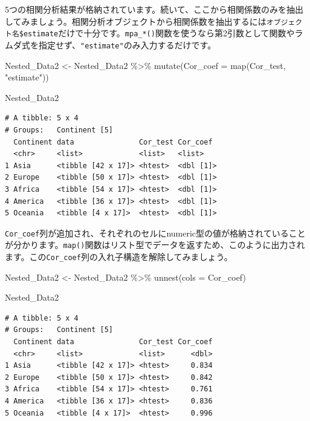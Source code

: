 \documentclass[
  a4paper,
  pandoc,
  ja=standard,
  jafont=haranoaji]{bxjsbook}
\newenvironment{Shaded}{\begin{snugshade}}{\end{snugshade}}
\newcommand{\AttributeTok}[1]{\textcolor[rgb]{0.00,0.48,0.65}{#1}}
\newcommand{\FunctionTok}[1]{\textcolor[rgb]{0.28,0.35,0.67}{#1}}
\newcommand{\NormalTok}[1]{\textcolor[rgb]{0.00,0.48,0.65}{#1}}
\newcommand{\OtherTok}[1]{\textcolor[rgb]{0.00,0.48,0.65}{#1}}
\newcommand{\SpecialCharTok}[1]{\textcolor[rgb]{0.37,0.37,0.37}{#1}}
\newcommand{\StringTok}[1]{\textcolor[rgb]{0.13,0.47,0.30}{#1}}
\begin{document}
5つの相関分析結果が格納されています。続いて、ここから相関係数のみを抽出してみましょう。相関分析オブジェクトから相関係数を抽出するには\texttt{オブジェクト名\$estimate}だけで十分です。\texttt{mpa\_*()}関数を使うなら第2引数として関数やラムダ式を指定せず、\texttt{"estimate"}のみ入力するだけです。

\begin{Shaded}
\begin{Highlighting}[numbers=left,,]
\NormalTok{Nested\_Data2 }\OtherTok{\textless{}{-}}\NormalTok{ Nested\_Data2 }\SpecialCharTok{\%\textgreater{}\%}
  \FunctionTok{mutate}\NormalTok{(}\AttributeTok{Cor\_coef =} \FunctionTok{map}\NormalTok{(Cor\_test, }\StringTok{"estimate"}\NormalTok{))}

\NormalTok{Nested\_Data2}
\end{Highlighting}
\end{Shaded}

\begin{verbatim}
# A tibble: 5 x 4
# Groups:   Continent [5]
  Continent data               Cor_test Cor_coef 
  <chr>     <list>             <list>   <list>   
1 Asia      <tibble [42 x 17]> <htest>  <dbl [1]>
2 Europe    <tibble [50 x 17]> <htest>  <dbl [1]>
3 Africa    <tibble [54 x 17]> <htest>  <dbl [1]>
4 America   <tibble [36 x 17]> <htest>  <dbl [1]>
5 Oceania   <tibble [4 x 17]>  <htest>  <dbl [1]>
\end{verbatim}

\texttt{Cor\_coef}列が追加され、それぞれのセルにnumeric型の値が格納されていることが分かります。\texttt{map()}関数はリスト型でデータを返すため、このように出力されます。この\texttt{Cor\_coef}列の入れ子構造を解除してみましょう。

\begin{Shaded}
\begin{Highlighting}[numbers=left,,]
\NormalTok{Nested\_Data2 }\OtherTok{\textless{}{-}}\NormalTok{ Nested\_Data2 }\SpecialCharTok{\%\textgreater{}\%}
  \FunctionTok{unnest}\NormalTok{(}\AttributeTok{cols =}\NormalTok{ Cor\_coef)}

\NormalTok{Nested\_Data2}
\end{Highlighting}
\end{Shaded}

\begin{verbatim}
# A tibble: 5 x 4
# Groups:   Continent [5]
  Continent data               Cor_test Cor_coef
  <chr>     <list>             <list>      <dbl>
1 Asia      <tibble [42 x 17]> <htest>     0.834
2 Europe    <tibble [50 x 17]> <htest>     0.842
3 Africa    <tibble [54 x 17]> <htest>     0.761
4 America   <tibble [36 x 17]> <htest>     0.836
5 Oceania   <tibble [4 x 17]>  <htest>     0.996
\end{verbatim}
\end{document}

